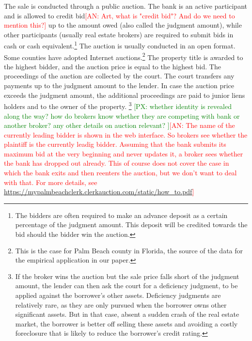 \documentclass[11pt,twopage]{article}
\newcommand{\AN}[1]{\textcolor{red}{[AN: #1]}}
\newcommand{\PX}[1]{\textcolor{green}{[PX: #1]}}
\begin{document}
The sale is conducted through a public auction.  The bank is an active participant and is 
  allowed to credit bid\AN{Art, what is "credit bid"? And do we need to mention this?} up to the amount owed (also called the
  judgment amount), while other participants (usually real estate
  brokers) are required to submit bids in cash or cash equivalent.\footnote{The bidders are often required to make an advance deposit as a certain percentage of the judgment amount. This deposit will be credited towards the bid should the bidder win the auction.}
  The
  auction is usually conducted in an open format. Some counties have
  adopted Internet auctions.\footnote{This is the case for Palm Beach
    county in Florida, the source of the data for the empirical
    application in our paper.} The property title is awarded to the
  highest bidder, and the auction price is equal to the highest
  bid. The proceedings of the auction are collected by the court. The court transfers
  any payments up to the judgment amount to the lender. In case the auction price
  exceeds the judgment amount, the additional proceedings are paid to junior liens
  holders and to the owner of the property.%
\footnote{If the broker wins the auction but the sale price falls short of the judgment amount, the lender can
then ask the court for a deficiency judgment, to be applied against the borrower's other assets. Deficiency
judgments are relatively rare, as they are only pursued when the borrower owns other significant assets. But in 
that case, absent a sudden crash of the real estate market, the borrower is better off selling these assets and 
avoiding a costly foreclosure that is likely to reduce the borrower's credit rating.}
 \PX{whether identity is revealed along the way? how do brokers know whether they are competing with bank or 
 another broker? any other details on auction relevant? }\AN{The name of the currently leading
 bidder is shown in the web interface. So brokers see whether the plaintiff 
 is the currently leadig bidder. 
 Assuming that the bank submits its maximum bid at the very 
 beginning and never updates it, a broker sees whether the bank has dropped out already.
 This of course does not cover the case in which the bank exits and then reenters
 the auction, but we don't want to deal with that. For more details, see
 \url{https://mypalmbeachclerk.clerkauction.com/static/how_to.pdf}}
\end{document}
